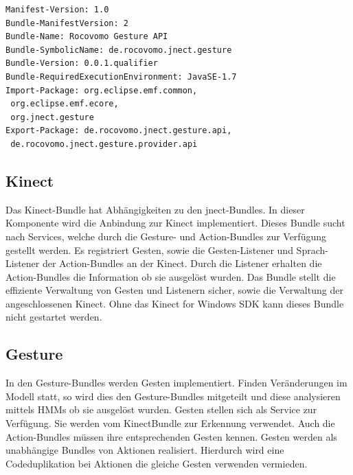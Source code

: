\lstset{language=Java,
 basicstyle=\footnotesize, 
 numbers=left,
 captionpos=b,
 showspaces=false,             
 showstringspaces=false,}
\begin{lstlisting}[caption={Manifest der Gesture API}, label={listing:manifestGestureAPI}]
Manifest-Version: 1.0
Bundle-ManifestVersion: 2
Bundle-Name: Rocovomo Gesture API
Bundle-SymbolicName: de.rocovomo.jnect.gesture
Bundle-Version: 0.0.1.qualifier
Bundle-RequiredExecutionEnvironment: JavaSE-1.7
Import-Package: org.eclipse.emf.common,
 org.eclipse.emf.ecore,
 org.jnect.gesture
Export-Package: de.rocovomo.jnect.gesture.api,
 de.rocovomo.jnect.gesture.provider.api
\end{lstlisting}

\subsection{Kinect}

Das Kinect-Bundle hat Abh\"angigkeiten zu den jnect-Bundles. In dieser Komponente wird die Anbindung zur Kinect implementiert. Dieses Bundle sucht nach Services, welche durch die Gesture- und Action-Bundles zur Verf\"ugung gestellt werden. Es registriert Gesten, sowie die Gesten-Listener und Sprach-Listener der Action-Bundles an der Kinect. Durch die Listener erhalten die Action-Bundles die Information ob sie ausgel\"ost wurden.
Das Bundle stellt die effiziente Verwaltung von Gesten und Listenern sicher, sowie die Verwaltung der angeschlossenen Kinect. Ohne das Kinect for Windows SDK kann dieses Bundle nicht gestartet werden.

\subsection{Gesture}

In den Gesture-Bundles werden Gesten implementiert. Finden Ver\"anderungen im Modell statt, so wird dies den Gesture-Bundles mitgeteilt und diese analysieren mittels HMMs ob sie ausgel\"ost wurden. Gesten stellen sich als Service zur Verf\"ugung. Sie werden vom KinectBundle zur Erkennung verwendet. Auch die Action-Bundles m\"ussen ihre entsprechenden Gesten kennen. Gesten werden als unabh\"angige Bundles von Aktionen realisiert. Hierdurch wird eine Codeduplikation bei Aktionen die gleiche Gesten verwenden vermieden.

